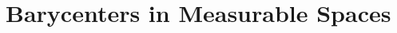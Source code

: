 \documentclass{report}
\theoremstyle{remark}
\theoremstyle{definition}
\begin{document}


\part{Barycenters in Measurable Spaces}







\printbibliography
\end{document}
